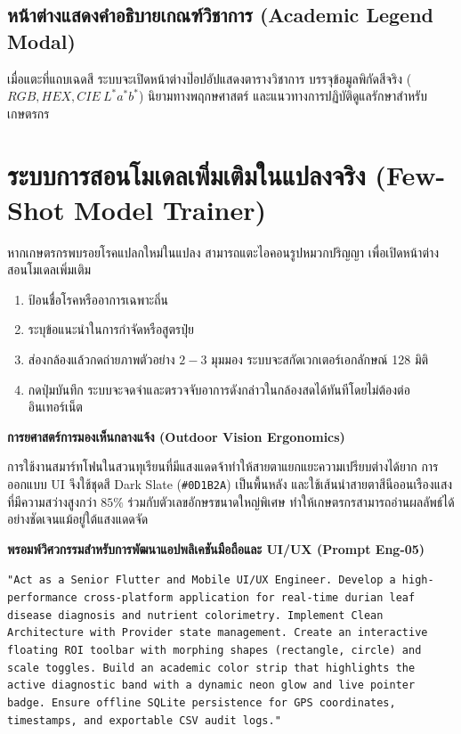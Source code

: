\subsection{หน้าต่างแสดงคำอธิบายเกณฑ์วิชาการ (Academic Legend Modal)}
เมื่อแตะที่แถบเฉดสี ระบบจะเปิดหน้าต่างป๊อปอัปแสดงตารางวิชาการ บรรจุข้อมูลพิกัดสีจริง ($RGB, HEX, CIE\ L^*a^*b^*$) นิยามทางพฤกษศาสตร์ และแนวทางการปฏิบัติดูแลรักษาสำหรับเกษตรกร

\section{ระบบการสอนโมเดลเพิ่มเติมในแปลงจริง (Few-Shot Model Trainer)}
หากเกษตรกรพบรอยโรคแปลกใหม่ในแปลง สามารถแตะไอคอนรูปหมวกปริญญา เพื่อเปิดหน้าต่างสอนโมเดลเพิ่มเติม
\begin{enumerate}
  \item ป้อนชื่อโรคหรืออาการเฉพาะถิ่น
  \item ระบุข้อแนะนำในการกำจัดหรือสูตรปุ๋ย
  \item ส่องกล้องแล้วกดถ่ายภาพตัวอย่าง $2 - 3$ มุมมอง ระบบจะสกัดเวกเตอร์เอกลักษณ์ 128 มิติ
  \item กดปุ่มบันทึก ระบบจะจดจำและตรวจจับอาการดังกล่าวในกล้องสดได้ทันทีโดยไม่ต้องต่ออินเทอร์เน็ต
\end{enumerate}

\begin{theorybox}
\textbf{การยศาสตร์การมองเห็นกลางแจ้ง (Outdoor Vision Ergonomics)}\par
การใช้งานสมาร์ทโฟนในสวนทุเรียนที่มีแสงแดดจ้าทำให้สายตาแยกแยะความเปรียบต่างได้ยาก การออกแบบ UI จึงใช้ชุดสี Dark Slate (\texttt{\#0D1B2A}) เป็นพื้นหลัง และใช้เส้นนำสายตาสีนีออนเรืองแสงที่มีความสว่างสูงกว่า $85\%$ ร่วมกับตัวเลขอักษรขนาดใหญ่พิเศษ ทำให้เกษตรกรสามารถอ่านผลลัพธ์ได้อย่างชัดเจนแม้อยู่ใต้แสงแดดจัด
\end{theorybox}

\begin{promptbox}
\textbf{พรอมพ์วิศวกรรมสำหรับการพัฒนาแอปพลิเคชันมือถือและ UI/UX (Prompt Eng-05)}\par
\texttt{"Act as a Senior Flutter and Mobile UI/UX Engineer. Develop a high-performance cross-platform application for real-time durian leaf disease diagnosis and nutrient colorimetry. Implement Clean Architecture with Provider state management. Create an interactive floating ROI toolbar with morphing shapes (rectangle, circle) and scale toggles. Build an academic color strip that highlights the active diagnostic band with a dynamic neon glow and live pointer badge. Ensure offline SQLite persistence for GPS coordinates, timestamps, and exportable CSV audit logs."}
\end{promptbox}
